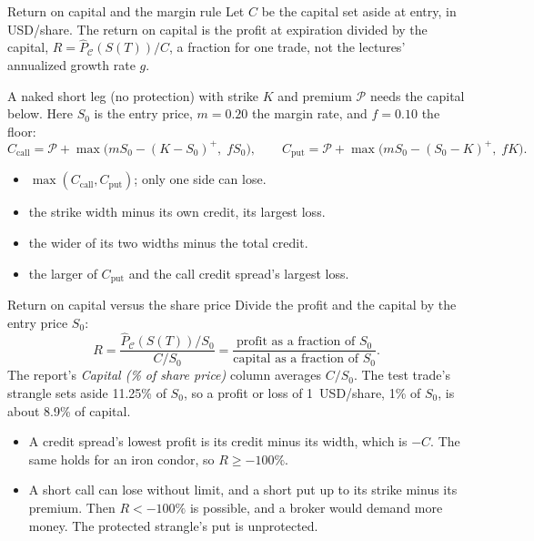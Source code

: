 \documentclass[aspectratio=169,11pt]{beamer}
\newcommand{\ST}{S(T)}
\newcommand{\Prem}{\mathcal{P}}
\newcommand{\Pc}{\hat{P}_{\mathcal{C}}}
\begin{document}
\begin{frame}{Return on capital and the margin rule}
Let $C$ be the capital set aside at entry, in USD/share. The return on capital
is the profit at expiration divided by the capital, $R=\Pc(\ST)/C$, a fraction
for one trade, not the lectures' annualized growth rate $g$.

\vspace{0.3em}
A naked short leg (no protection) with strike $K$ and premium $\Prem$ needs the
capital below. Here $S_0$ is the entry price, $m=0.20$ the margin rate, and
$f=0.10$ the floor:
\[
 C_{\text{call}}=\Prem+\max\bigl(mS_0-(K-S_0)^{+},\;fS_0\bigr),\qquad
 C_{\text{put}}=\Prem+\max\bigl(mS_0-(S_0-K)^{+},\;fK\bigr).
\]
\vspace{-0.4em}
\begin{itemize}\setlength{\itemsep}{0.2em}
\item {} $\max(C_{\text{call}},C_{\text{put}})$; only one side can lose.
\item {} the strike width minus its own credit, its largest loss.
\item {} the wider of its two widths minus the total credit.
\item {} the larger of $C_{\text{put}}$ and the call
credit spread's largest loss.
\end{itemize}
\end{frame}

\begin{frame}{Return on capital versus the share price}
Divide the profit and the capital by the entry price $S_0$:
\[
 R=\frac{\Pc(\ST)/S_0}{C/S_0}
  =\frac{\text{profit as a fraction of } S_0}{\text{capital as a fraction of } S_0}.
\]
The report's \textit{Capital (\% of share price)} column averages $C/S_0$. The
test trade's strangle sets aside 11.25\% of $S_0$, so a profit or loss of
1~USD/share, 1\% of $S_0$, is about 8.9\% of capital.
\vspace{0.5em}
\begin{itemize}\setlength{\itemsep}{0.45em}
\item {} A credit spread's lowest profit is
its credit minus its width, which is $-C$. The same holds for an iron condor,
so $R\geq-100\%$.
\item {} A short call can lose without
limit, and a short put up to its strike minus its premium. Then $R<-100\%$ is
possible, and a broker would demand more money. The protected strangle's put
is unprotected.
\end{itemize}
\end{frame}
\end{document}
